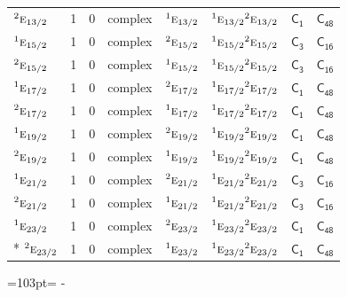 \documentclass[10pt,a4paper]{article}
\newcommand{\needspace}[1]{\par\penalty-100\begingroup\dimen0=#1\relax\dimen2=\pagegoal
  \advance\dimen2-\pagetotal\ifdim\dimen0>\dimen2\relax\ifdim\dimen2>0pt\vfil\break\fi\fi
  \endgroup}
\numberwithin{equation}{section}
\newcommand{\grp}[1]{\mathsf{#1}}
\newcommand{\irr}[1]{\text{\normalfont\scshape #1}}
\newcommand{\conjpair}[1]{{}^{#1}}
\begin{document}
{\begin{longtable}{@{}lrrlllll@{}}
$\conjpair{2}\irr{e}_{13/2}$ & 1 & $0$ & complex & $\conjpair{1}\irr{e}_{13/2}$ & $\conjpair{1}\irr{e}_{13/2}\conjpair{2}\irr{e}_{13/2}$ & \href{C1.pdf}{$\grp{C_{1}}$} & $\grp{C_{48}}$\\
$\conjpair{1}\irr{e}_{15/2}$ & 1 & $0$ & complex & $\conjpair{2}\irr{e}_{15/2}$ & $\conjpair{1}\irr{e}_{15/2}\conjpair{2}\irr{e}_{15/2}$ & \href{C3.pdf}{$\grp{C_{3}}$} & $\grp{C_{16}}$\\
$\conjpair{2}\irr{e}_{15/2}$ & 1 & $0$ & complex & $\conjpair{1}\irr{e}_{15/2}$ & $\conjpair{1}\irr{e}_{15/2}\conjpair{2}\irr{e}_{15/2}$ & \href{C3.pdf}{$\grp{C_{3}}$} & $\grp{C_{16}}$\\
$\conjpair{1}\irr{e}_{17/2}$ & 1 & $0$ & complex & $\conjpair{2}\irr{e}_{17/2}$ & $\conjpair{1}\irr{e}_{17/2}\conjpair{2}\irr{e}_{17/2}$ & \href{C1.pdf}{$\grp{C_{1}}$} & $\grp{C_{48}}$\\
$\conjpair{2}\irr{e}_{17/2}$ & 1 & $0$ & complex & $\conjpair{1}\irr{e}_{17/2}$ & $\conjpair{1}\irr{e}_{17/2}\conjpair{2}\irr{e}_{17/2}$ & \href{C1.pdf}{$\grp{C_{1}}$} & $\grp{C_{48}}$\\
$\conjpair{1}\irr{e}_{19/2}$ & 1 & $0$ & complex & $\conjpair{2}\irr{e}_{19/2}$ & $\conjpair{1}\irr{e}_{19/2}\conjpair{2}\irr{e}_{19/2}$ & \href{C1.pdf}{$\grp{C_{1}}$} & $\grp{C_{48}}$\\
$\conjpair{2}\irr{e}_{19/2}$ & 1 & $0$ & complex & $\conjpair{1}\irr{e}_{19/2}$ & $\conjpair{1}\irr{e}_{19/2}\conjpair{2}\irr{e}_{19/2}$ & \href{C1.pdf}{$\grp{C_{1}}$} & $\grp{C_{48}}$\\
$\conjpair{1}\irr{e}_{21/2}$ & 1 & $0$ & complex & $\conjpair{2}\irr{e}_{21/2}$ & $\conjpair{1}\irr{e}_{21/2}\conjpair{2}\irr{e}_{21/2}$ & \href{C3.pdf}{$\grp{C_{3}}$} & $\grp{C_{16}}$\\
$\conjpair{2}\irr{e}_{21/2}$ & 1 & $0$ & complex & $\conjpair{1}\irr{e}_{21/2}$ & $\conjpair{1}\irr{e}_{21/2}\conjpair{2}\irr{e}_{21/2}$ & \href{C3.pdf}{$\grp{C_{3}}$} & $\grp{C_{16}}$\\
$\conjpair{1}\irr{e}_{23/2}$ & 1 & $0$ & complex & $\conjpair{2}\irr{e}_{23/2}$ & $\conjpair{1}\irr{e}_{23/2}\conjpair{2}\irr{e}_{23/2}$ & \href{C1.pdf}{$\grp{C_{1}}$} & $\grp{C_{48}}$\\*
$\conjpair{2}\irr{e}_{23/2}$ & 1 & $0$ & complex & $\conjpair{1}\irr{e}_{23/2}$ & $\conjpair{1}\irr{e}_{23/2}\conjpair{2}\irr{e}_{23/2}$ & \href{C1.pdf}{$\grp{C_{1}}$} & $\grp{C_{48}}$\\
\bottomrule\end{longtable}}
\needspace{103pt}
\end{document}

